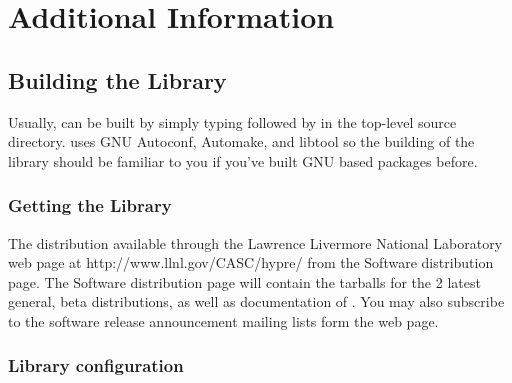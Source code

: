 \chapter{Additional Information}


\section{Building the Library}

Usually, \hypre{} can be built by simply typing 
followed by  in the top-level source directory.
\hypre{} uses GNU Autoconf, Automake, and libtool so the building 
of the \hypre{} library should be familiar to you if you've built GNU
based packages before.

\subsection{Getting the Library}

The \hypre{} distribution available through the Lawrence Livermore 
National Laboratory \hypre{} web page at
{http://www.llnl.gov/CASC/hypre/} from the Software distribution page. 
The \hypre{} Software distribution page will contain the tarballs for the 2
latest general, beta distributions, as well as documentation of \hypre{}. 
You may also subscribe to the \hypre{} software release announcement mailing 
lists form the \hypre{} web page.

\subsection{Library configuration}

